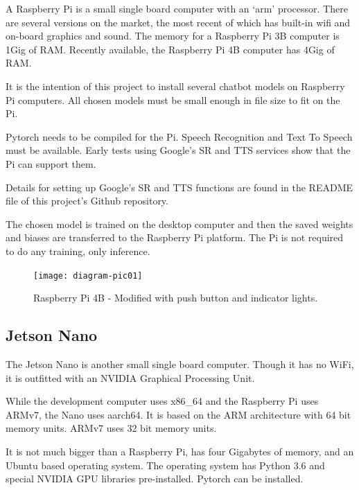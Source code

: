 A Raspberry Pi is a small single board computer with an `arm' processor. There are several versions on the market, the most recent of which has built-in wifi and on-board graphics and sound. The memory for a Raspberry Pi 3B computer is 1Gig of RAM. Recently available, the Raspberry Pi 4B computer has 4Gig of RAM.

It is the intention of this project to install several chatbot models on Raspberry Pi computers. All chosen models must be small enough in file size to fit on the Pi.

Pytorch needs to be compiled for the Pi. Speech Recognition and Text To Speech must be available. Early tests using Google\textquoteright s \ac{SR} and TTS services show that the Pi can support them. 


Details for setting up Google's SR and TTS functions are found in the README file of this project\textquoteright s Github repository.

The chosen model is trained on the desktop computer and then the saved weights and biases are transferred to the Raspberry Pi platform. The Pi is not required to do any training, only inference. 

\begin{figure}[H]
	\begin{center}
		\texttt{[image: diagram-pic01]}
		
		
	\end{center}
	\caption[Raspberry Pi]{Raspberry Pi 4B - Modified with push button and indicator lights.}
	
	
\end{figure}

\subsection{Jetson Nano}

The Jetson Nano is another small single board computer. Though it has no WiFi, it is outfitted with an NVIDIA Graphical Processing Unit. 

While the development computer uses x86\_64 and the Raspberry Pi uses ARMv7, the Nano uses aarch64. It is based on the ARM architecture with 64 bit memory units. ARMv7 uses 32 bit memory units.

It is not much bigger than a Raspberry Pi, has four Gigabytes of memory, and an Ubuntu based operating system. The operating system has Python 3.6 and special NVIDIA GPU libraries pre-installed. Pytorch can be installed.

